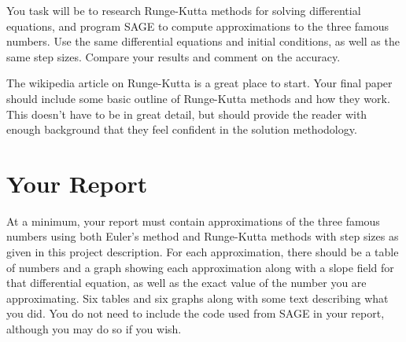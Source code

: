 \documentclass
[justified,nohyper]
{tufte-handout}
\begin{document}
You task will be to research Runge-Kutta methods for solving differential equations,
and program SAGE to compute approximations to the three famous numbers. Use
the same differential equations and initial conditions, as well as the same
step sizes. Compare your results and comment on the accuracy.

The wikipedia article on Runge-Kutta is a great place to start. Your final paper
should include some basic outline of Runge-Kutta methods and how they work. This
doesn't have to be in great detail, but should provide the reader with enough
background that they feel confident in the solution methodology.

\section*{Your Report}
At a minimum, your report must contain approximations of the three famous numbers
using both Euler's method and Runge-Kutta methods with step sizes as given
in this project description. For each approximation, there
should be a table of numbers and a graph showing each approximation along with
a slope field for that differential equation, as well as the exact value of
the number you are approximating. Six tables and six graphs along with some
text describing what you did. You do not need to include the code used from SAGE
in your report, although you may do so if you wish.
\end{document}
